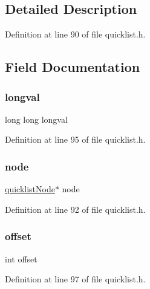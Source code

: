 \subsection{Detailed Description}


Definition at line 90 of file quicklist.\+h.



\subsection{Field Documentation}
\mbox{\label{structquicklist_entry_abf0b4c9cc55c75787c954aa8f383cdd9}} 
\subsubsection{\texorpdfstring{longval}{longval}}
{\footnotesize\ttfamily long long longval}



Definition at line 95 of file quicklist.\+h.

\mbox{\label{structquicklist_entry_a78fcac69a40608d499c1efd0fe66593a}} 
\subsubsection{\texorpdfstring{node}{node}}
{\footnotesize\ttfamily \hyperlink{structquicklist_node}{quicklist\+Node}$\ast$ node}



Definition at line 92 of file quicklist.\+h.

\mbox{\label{structquicklist_entry_aed7ea92f45bd273dde380a45ddced592}} 
\subsubsection{\texorpdfstring{offset}{offset}}
{\footnotesize\ttfamily int offset}



Definition at line 97 of file quicklist.\+h.


